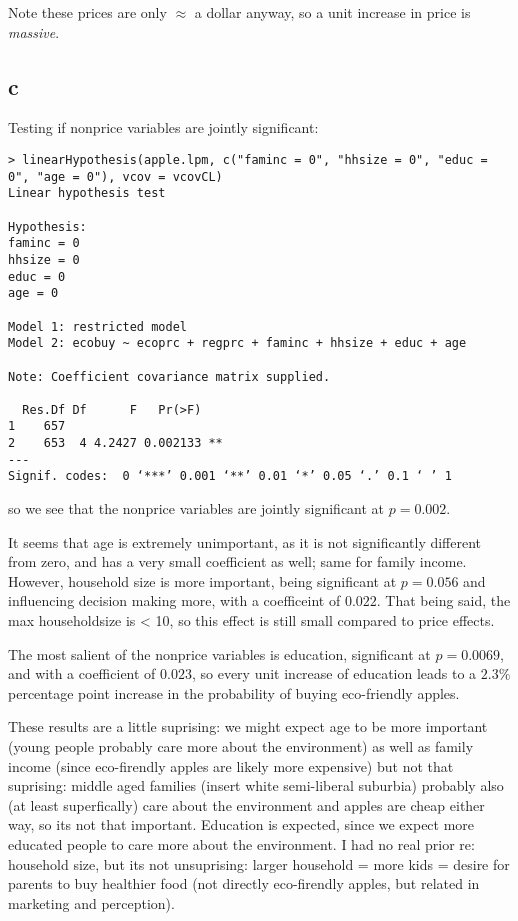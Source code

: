 \documentclass[12pt,letterpaper]{article}
\theoremstyle{definition}
\begin{document}
Note these prices are only $\approx$ a dollar anyway, so a unit increase in price is \textit{massive}.

\subsection*{c}

Testing if nonprice variables are jointly significant:
\begin{Verbatim}[fontsize=\small]
> linearHypothesis(apple.lpm, c("faminc = 0", "hhsize = 0", "educ = 0", "age = 0"), vcov = vcovCL)
Linear hypothesis test

Hypothesis:
faminc = 0
hhsize = 0
educ = 0
age = 0

Model 1: restricted model
Model 2: ecobuy ~ ecoprc + regprc + faminc + hhsize + educ + age

Note: Coefficient covariance matrix supplied.

  Res.Df Df      F   Pr(>F)
1    657
2    653  4 4.2427 0.002133 **
---
Signif. codes:  0 ‘***’ 0.001 ‘**’ 0.01 ‘*’ 0.05 ‘.’ 0.1 ‘ ’ 1
\end{Verbatim}
so we see that the nonprice variables are jointly significant at $p = 0.002$.

It seems that age is extremely unimportant, as it is not significantly different from zero, and has a very small coefficient as well; same for family income. However, household size is more important, being significant at $p = 0.056$ and influencing decision making more, with a coefficeint of $0.022$. That being said, the max householdsize is < 10, so this effect is still small compared to price effects.

The most salient of the nonprice variables is education, significant at $p = 0.0069$, and with a coefficient of $0.023$, so every unit increase of education leads to a $2.3\%$ percentage point increase in the probability of buying eco-friendly apples.

These results are a little suprising: we might expect age to be more important (young people probably care more about the environment) as well as family income (since eco-firendly apples are likely more expensive) but not that suprising: middle aged families (insert white semi-liberal suburbia) probably also (at least superfically) care about the environment and apples are cheap either way, so its not that important. Education is expected, since we expect more educated people to care more about the environment. I had no real prior re: household size, but its not unsuprising: larger household = more kids = desire for parents to buy healthier food (not directly eco-firendly apples, but related in marketing and perception).
\end{document}
